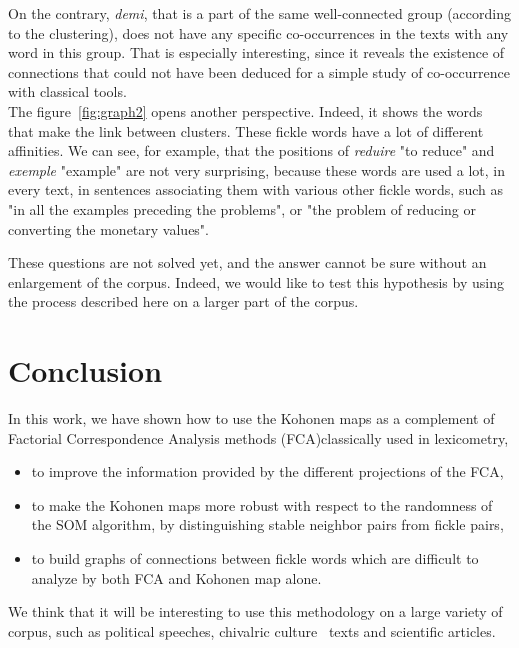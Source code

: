 \documentclass[preprint]{elsarticle}
\begin{document}
On the contrary, \textit{demi}, that is a part of the same well-connected group (according to the clustering), does not have any specific co-occurrences in the texts with any word in this group. That is especially interesting, since it reveals the existence of connections that could not have been deduced for a simple study of co-occurrence with classical tools.\\

The figure~\ref{fig:graph2} opens another perspective. Indeed, it shows the words that make the link between clusters. These fickle words have a lot of different affinities. We can see, for example, that the positions of \textit{reduire} "to reduce" and \textit{exemple} "example" are not very surprising, because these words are used a lot, in every text, in sentences associating them with various other fickle words, such as "in all the examples preceding the problems", or "the problem of reducing or converting the monetary values".

These questions are not solved yet, and the answer cannot be sure without an enlargement of the corpus. Indeed, we would like to test this hypothesis by using the process described here on a larger part of the corpus.

\section*{Conclusion}

In this work, we have shown how to use the Kohonen maps as a complement of Factorial Correspondence  Analysis  methods (FCA)classically used in lexicometry,

\begin{itemize}
\item to improve the information provided by the different projections of the FCA,

\item to make the Kohonen maps more robust with respect to the randomness of the SOM  algorithm, by distinguishing stable neighbor pairs from fickle pairs,

\item to build graphs of connections between fickle words which are difficult to analyze by both FCA and Kohonen map alone.
\end{itemize}

We think that it will be interesting to use this methodology on a large variety of corpus, such as political speeches, chivalric culture~\cite{Der2010} texts and scientific articles. 



\end{document}

